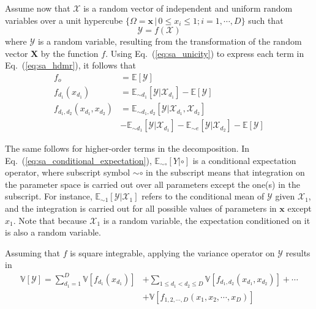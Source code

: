Assume now that $\bm{\mathcal{X}}$ is a random vector of independent and uniform random variables over a unit hypercube
$\{\Omega = \mathbf{x} \, | \, 0 \leq x_i  \leq 1; i = 1,\cdots, D\}$ such that
\begin{equation}
	\mathcal{Y} = f(\bm{\mathcal{X}})
\label{eq:sa_random_function}
\end{equation}
where $\mathcal{Y}$ is a random variable, resulting from the transformation of the random vector $\mathbf{X}$ by the function $f$.
Using Eq.~(\ref{eq:sa_unicity}) to express each term in Eq.~(\ref{eq:sa_hdmr}), it follows that
\begin{equation}
	\begin{split}
		f_o & = \mathbb{E}[\mathcal{Y}] \\
	  f_{d_1}(x_{d_1}) & = \mathbb{E}_{\sim d_1}[\mathcal{Y}|\mathcal{X}_{d_1}] - \mathbb{E}[\mathcal{Y}]\\
    f_{d_1,d_2}(x_{d_1},x_{d_2}) & = \mathbb{E}_{\sim d_1,d_2} [\mathcal{Y}|\mathcal{X}_{d_1}, \mathcal{X}_{d_2}] \\
																 & - \mathbb{E}_{\sim d_1}[\mathcal{Y}|\mathcal{X}_{d_1}] - \mathbb{E}_{\sim e}[\mathcal{Y}|\mathcal{X}_{d_2}] - \mathbb{E}[\mathcal{Y}] 
	\end{split}
\label{eq:sa_conditional_expectation}
\end{equation}

The same follows for higher-order terms in the decomposition. 
In Eq.~(\ref{eq:sa_conditional_expectation}),
$\mathbb{E}_{\sim \circ} [Y|\circ]$ is a conditional expectation operator,
where subscript symbol $\sim\circ$ in the subscript means that integration on the parameter space is carried out over all parameters except the one(s) in the subscript.
For instance, $\mathbb{E}_{\sim 1} [\mathcal{Y}|\mathcal{X}_1]$ refers to the conditional mean of $\mathcal{Y}$ given $\mathcal{X}_1$, and the integration is carried out for all possible values of parameters in $\mathbf{x}$ except $x_1$.
Note that because $\mathcal{X}_1$ is a random variable, the expectation conditioned on it is also a random variable.

Assuming that $f$ is square integrable, applying the variance operator on $\mathcal{Y}$ results in
\begin{equation}
	\begin{split}
		\mathbb{V}[\mathcal{Y}] = \sum_{d_1=1}^{D} \mathbb{V}[f_{d_1} (x_{d_1})] & + \sum_{1 \leq d_1 < d_2 \leq D} \mathbb{V} [f_{d_1,d_2} (x_{d_1}, x_{d_2})] + \cdots \\
	                                                       & + \mathbb{V} [f_{1,2,\cdots,D} (x_1, x_2, \cdots, x_D)]
		\end{split}
\label{eq:sa_variance_decomposition}
\end{equation}

